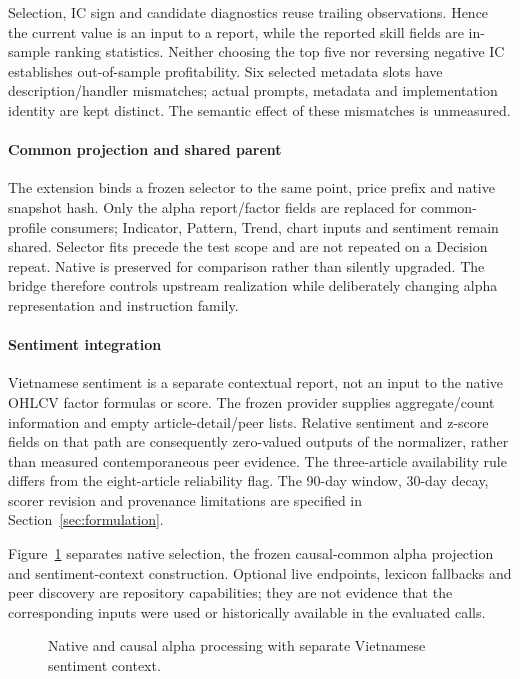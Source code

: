 Selection, IC sign and candidate diagnostics reuse trailing observations. Hence the current value is an input to a report, while the reported skill fields are in-sample ranking statistics. Neither choosing the top five nor reversing negative IC establishes out-of-sample profitability. Six selected metadata slots have description/handler mismatches; actual prompts, metadata and implementation identity are kept distinct. The semantic effect of these mismatches is unmeasured.

\paragraph{Common projection and shared parent}
The extension binds a frozen selector to the same point, price prefix and native snapshot hash. Only the alpha report/factor fields are replaced for common-profile consumers; Indicator, Pattern, Trend, chart inputs and sentiment remain shared. Selector fits precede the test scope and are not repeated on a Decision repeat. Native is preserved for comparison rather than silently upgraded. The bridge therefore controls upstream realization while deliberately changing alpha representation and instruction family.

\paragraph{Sentiment integration}
Vietnamese sentiment is a separate contextual report, not an input to the native OHLCV factor formulas or score. The frozen provider supplies aggregate/count information and empty article-detail/peer lists. Relative sentiment and z-score fields on that path are consequently zero-valued outputs of the normalizer, rather than measured contemporaneous peer evidence. The three-article availability rule differs from the eight-article reliability flag. The 90-day window, 30-day decay, scorer revision and provenance limitations are specified in Section~\ref{sec:formulation}.

Figure~\ref{fig:alpha_agent} separates native selection, the frozen causal-common alpha projection and sentiment-context construction. Optional live endpoints, lexicon fallbacks and peer discovery are repository capabilities; they are not evidence that the corresponding inputs were used or historically available in the evaluated calls.

\begin{figure}[htb]
\centering
\caption{Native and causal alpha processing with separate Vietnamese sentiment context.}
\label{fig:alpha_agent}
\end{figure}

